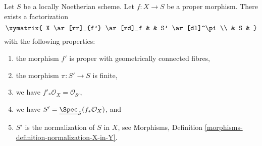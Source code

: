 \begin{theorem}
\label{theorem-stein-factorization-Noetherian}
Let $S$ be a locally Noetherian scheme.
Let $f : X \to S$ be a proper morphism.
There exists a factorization
$$
\xymatrix{
X \ar[rr]_{f'} \ar[rd]_f & & S' \ar[dl]^\pi \\
& S &
}
$$
with the following properties:
\begin{enumerate}
\item the morphism $f'$ is proper with geometrically connected fibres,
\item the morphism $\pi : S' \to S$ is finite,
\item we have $f'_*\mathcal{O}_X = \mathcal{O}_{S'}$,
\item we have $S' = \underline{\Spec}_S(f_*\mathcal{O}_X)$, and
\item $S'$ is the normalization of $S$ in $X$, see
Morphisms, Definition \ref{morphisms-definition-normalization-X-in-Y}.
\end{enumerate}
\end{theorem}

